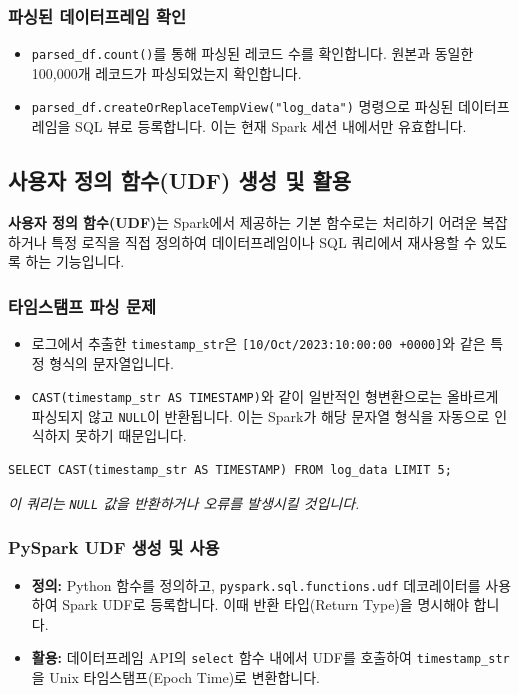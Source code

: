 \documentclass[11pt,a4paper]{article}
\theoremstyle{definition}
\begin{document}
\subsubsection{파싱된 데이터프레임 확인}
\begin{itemize}
    \item \texttt{parsed_df.count()}를 통해 파싱된 레코드 수를 확인합니다. 원본과 동일한 100,000개 레코드가 파싱되었는지 확인합니다.
    \item \texttt{parsed_df.createOrReplaceTempView("log_data")} 명령으로 파싱된 데이터프레임을 SQL 뷰로 등록합니다. 이는 현재 Spark 세션 내에서만 유효합니다.
\end{itemize}

\subsection{사용자 정의 함수(UDF) 생성 및 활용}

\begin{conceptbox}
\textbf{사용자 정의 함수(UDF)}는 Spark에서 제공하는 기본 함수로는 처리하기 어려운 복잡하거나 특정 로직을 직접 정의하여 데이터프레임이나 SQL 쿼리에서 재사용할 수 있도록 하는 기능입니다.
\end{conceptbox}

\subsubsection{타임스탬프 파싱 문제}
\begin{itemize}
    \item 로그에서 추출한 \texttt{timestamp_str}은 \texttt{[10/Oct/2023:10:00:00 +0000]}와 같은 특정 형식의 문자열입니다.
    \item \texttt{CAST(timestamp_str AS TIMESTAMP)}와 같이 일반적인 형변환으로는 올바르게 파싱되지 않고 \texttt{NULL}이 반환됩니다. 이는 Spark가 해당 문자열 형식을 자동으로 인식하지 못하기 때문입니다.
\end{itemize}

\begin{lstlisting}[label={lst:fail_timestamp_cast}]
SELECT CAST(timestamp_str AS TIMESTAMP) FROM log_data LIMIT 5;
\end{lstlisting}
\textit{이 쿼리는 \texttt{NULL} 값을 반환하거나 오류를 발생시킬 것입니다.}

\subsubsection{PySpark UDF 생성 및 사용}
\begin{itemize}
    \item \textbf{정의:} Python 함수를 정의하고, \texttt{pyspark.sql.functions.udf} 데코레이터를 사용하여 Spark UDF로 등록합니다. 이때 반환 타입(Return Type)을 명시해야 합니다.
    \item \textbf{활용:} 데이터프레임 API의 \texttt{select} 함수 내에서 UDF를 호출하여 \texttt{timestamp_str}을 Unix 타임스탬프(Epoch Time)로 변환합니다.
\end{itemize}
\end{document}
